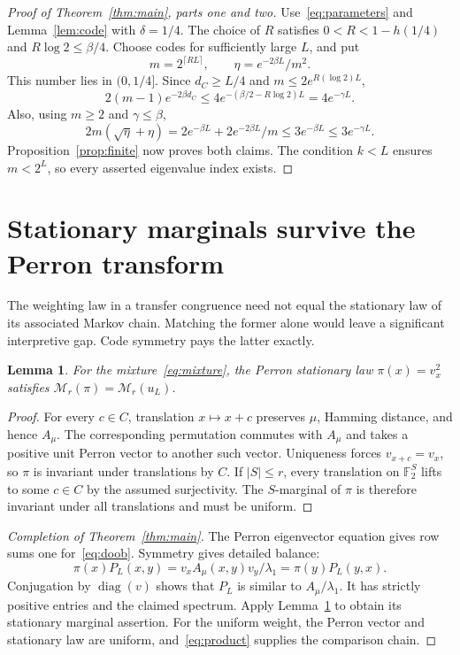 \documentclass[11pt]{article}
\newtheorem{lemma}[theorem]{Lemma}
\newcommand{\F}{\mathbb F}
\newcommand{\diag}{\operatorname{diag}}
\begin{document}
\begin{proof}[Proof of Theorem~\ref{thm:main}, parts one and two]
Use~\eqref{eq:parameters} and Lemma~\ref{lem:code} with $\delta=1/4$.
The choice of $R$ satisfies $0<R<1-h(1/4)$ and $R\log2\le\beta/4$.
Choose codes for sufficiently large $L$, and put
\[
 m=2^{\lceil RL\rceil},\qquad \eta=e^{-2\beta L}/m^2.
\]
This number lies in $(0,1/4]$. Since $d_C\ge L/4$ and
$m\le2e^{R(\log2)L}$,
\[
 2(m-1)e^{-2\beta d_C}\le4e^{-(\beta/2-R\log2)L}
          =4e^{-\gamma L}.
\]
Also, using $m\ge2$ and $\gamma\le\beta$,
\[
 2m(\sqrt\eta+\eta)
   =2e^{-\beta L}+2e^{-2\beta L}/m
   \le3e^{-\beta L}\le3e^{-\gamma L}.
\]
Proposition~\ref{prop:finite} now proves both claims. The condition $k<L$
ensures $m<2^L$, so every asserted eigenvalue index exists.
\end{proof}

\section{Stationary marginals survive the Perron transform}
The weighting law in a transfer congruence need not equal the stationary
law of its associated Markov chain. Matching the former alone would leave
a significant interpretive gap. Code symmetry pays the latter exactly.

\begin{lemma}\label{lem:symmetry}
For the mixture~\eqref{eq:mixture}, the Perron stationary law
$\pi(x)=v_x^2$ satisfies $\mathcal M_r(\pi)=\mathcal M_r(u_L)$.
\end{lemma}
\begin{proof}
For every $c\in C$, translation $x\mapsto x+c$ preserves $\mu$, Hamming
distance, and hence $A_\mu$. The corresponding permutation commutes with
$A_\mu$ and takes a positive unit Perron vector to another such vector.
Uniqueness forces $v_{x+c}=v_x$, so $\pi$ is invariant under translations
by $C$. If $|S|\le r$, every translation on $\F_2^S$ lifts to some
$c\in C$ by the assumed surjectivity. The $S$-marginal of $\pi$ is
therefore invariant under all translations and must be uniform.
\end{proof}

\begin{proof}[Completion of Theorem~\ref{thm:main}]
The Perron eigenvector equation gives row sums one for~\eqref{eq:doob}.
Symmetry gives detailed balance:
\[
 \pi(x)P_L(x,y)=v_xA_\mu(x,y)v_y/\lambda_1
              =\pi(y)P_L(y,x).
\]
Conjugation by $\diag(v)$ shows that $P_L$ is similar to $A_\mu/\lambda_1$.
It has strictly positive entries and the claimed spectrum. Apply
Lemma~\ref{lem:symmetry} to obtain its stationary marginal assertion.
For the uniform weight, the Perron vector and stationary law are uniform,
and~\eqref{eq:product} supplies the comparison chain.
\end{proof}
\end{document}
